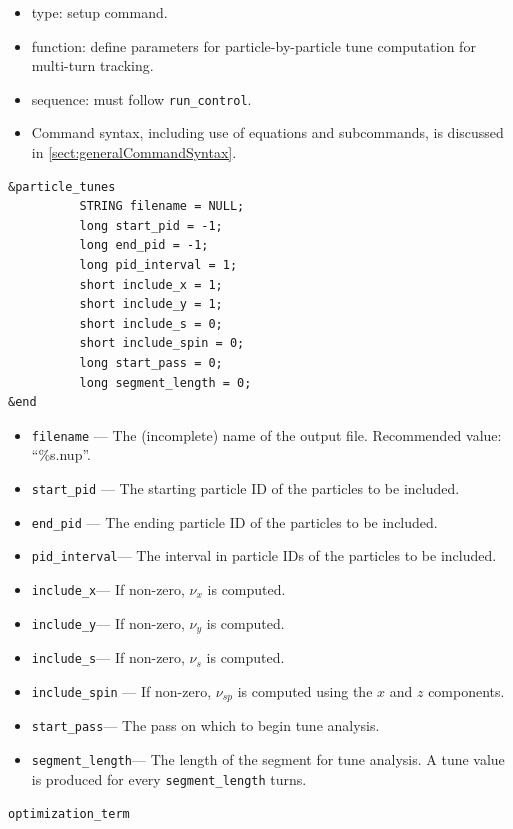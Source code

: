 \documentclass[11pt]{article}
\begin{document}
\begin{itemize}
\item type: setup command.
\item function: define parameters for particle-by-particle tune computation for multi-turn tracking.
\item sequence: must follow \verb|run_control|.
\item Command syntax, including use of equations and subcommands, is discussed in \ref{sect:generalCommandSyntax}.
\end{itemize}

\begin{verbatim}
&particle_tunes
          STRING filename = NULL;
          long start_pid = -1;
          long end_pid = -1;
          long pid_interval = 1;
          short include_x = 1;
          short include_y = 1;
          short include_s = 0;
          short include_spin = 0;
          long start_pass = 0;
          long segment_length = 0;
&end
\end{verbatim}

\begin{itemize}
\item \verb|filename| --- The (incomplete) name of the output file. Recommended value: ``\%s.nup''.
\item \verb|start_pid| --- The starting particle ID of the particles to be included.
\item \verb|end_pid| --- The ending particle ID of the particles to be included.
\item \verb|pid_interval|--- The interval in particle IDs of the particles to be included.
\item \verb|include_x|--- If non-zero, $\nu_x$ is computed.
\item \verb|include_y|--- If non-zero, $\nu_y$ is computed.
\item \verb|include_s|--- If non-zero, $\nu_s$ is computed.
\item \verb|include_spin| --- If non-zero, $\nu_{sp}$ is computed using the $x$ and $z$ components.
\item \verb|start_pass|--- The pass on which to begin tune analysis.
\item \verb|segment_length|--- The length of the segment for tune analysis. A tune value is produced for every
  \verb|segment_length| turns.
\end{itemize}


\newpage
\begin{center}{\Large\verb|optimization_term|}\end{center}
\end{document}
